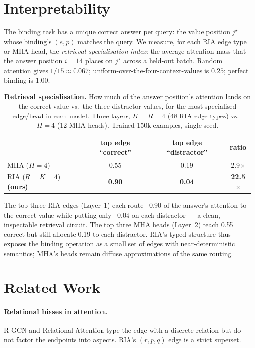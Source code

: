 \documentclass{article}
\begin{document}
\section{Interpretability}
\label{sec:interpretability}

The binding task has a unique correct answer per query: the value
position $j^\star$ whose binding's $(e, p)$ matches the query. We
measure, for each RIA edge type or MHA head, the
\emph{retrieval-specialisation index}: the average attention mass
that the answer position $i{=}14$ places on $j^\star$ across a
held-out batch. Random attention gives $1/15 \approx 0.067$;
uniform-over-the-four-context-values is $0.25$; perfect binding is
$1.00$.

\begin{table}[h]
\centering
\caption{\textbf{Retrieval specialisation.} How much of the answer
position's attention lands on the correct value vs.\ the three
distractor values, for the most-specialised edge/head in each model.
Three layers, $K{=}R{=}4$ (48 RIA edge types) vs.\ $H{=}4$ (12 MHA
heads). Trained 150k examples, single seed.}
\label{tab:interp}
\begin{tabular}{lccc}
\toprule
                                  & top edge ``correct'' & top edge ``distractor'' & ratio \\
\midrule
MHA ($H{=}4$)                     &  0.55              &  0.19                   & 2.9$\times$ \\
RIA ($R{=}K{=}4$) \textbf{(ours)} &  \textbf{0.90}     &  \textbf{0.04}          & \textbf{22.5$\times$} \\
\bottomrule
\end{tabular}
\end{table}

The top three RIA edges (Layer~1) each route ~0.90 of the answer's
attention to the correct value while putting only ~0.04 on each
distractor --- a clean, inspectable retrieval circuit. The top three
MHA heads (Layer~2) reach 0.55 correct but still allocate 0.19 to
each distractor. RIA's typed structure thus exposes the binding
operation as a small set of edges with near-deterministic semantics;
MHA's heads remain diffuse approximations of the same routing.

\section{Related Work}

\paragraph{Relational biases in attention.} R-GCN
\citep{schlichtkrull2018modeling} and Relational Attention
\citep{diao2023relational} type the edge with a discrete relation but
do not factor the endpoints into aspects. RIA's $(r, p, q)$ edge is a
strict superset.
\end{document}
